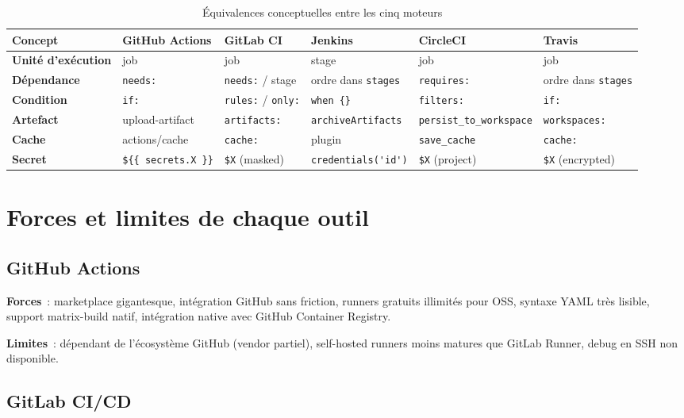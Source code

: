 \documentclass[12pt,a4paper]{report}
\begin{document}
\begin{table}[h!]
\centering
\scriptsize
\renewcommand{\arraystretch}{1.3}
\begin{tabular}{>{\bfseries}p{2.5cm} p{2.5cm} p{2cm} p{2.5cm} p{2.3cm} p{2cm}}
\toprule
Concept & GitHub Actions & GitLab CI & Jenkins & CircleCI & Travis \\
\midrule
Unité d'exécution & job             & job        & stage         & job        & job \\
Dépendance        & \texttt{needs:} & \texttt{needs:} / stage & ordre dans \texttt{stages} & \texttt{requires:} & ordre dans \texttt{stages} \\
Condition         & \texttt{if:}    & \texttt{rules:} / \texttt{only:} & \texttt{when \{\}} & \texttt{filters:} & \texttt{if:} \\
Artefact          & upload-artifact & \texttt{artifacts:} & \texttt{archiveArtifacts} & \texttt{persist\_to\_workspace} & \texttt{workspaces:} \\
Cache             & actions/cache   & \texttt{cache:} & plugin & \texttt{save\_cache} & \texttt{cache:} \\
Secret            & \verb|${{ secrets.X }}| & \verb|$X| (masked) & \verb|credentials('id')| & \verb|$X| (project) & \verb|$X| (encrypted) \\
\bottomrule
\end{tabular}
\caption{Équivalences conceptuelles entre les cinq moteurs}
\label{tab:equivalences}
\end{table}

\section{Forces et limites de chaque outil}

\subsection{GitHub Actions}

\textbf{Forces}~: marketplace gigantesque, intégration GitHub sans friction,
runners gratuits illimités pour OSS, syntaxe YAML très lisible, support
matrix-build natif, intégration native avec GitHub Container Registry.

\textbf{Limites}~: dépendant de l'écosystème GitHub (vendor partiel), self-hosted
runners moins matures que GitLab Runner, debug en SSH non disponible.

\subsection{GitLab CI/CD}
\end{document}
